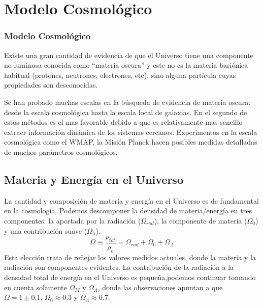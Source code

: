 \documentclass{beamer}
\begin{document}
\section{Modelo Cosmológico}
	\begin{frame}
		\frametitle{Modelo Cosmológico}
		Existe una gran cantidad de evidencia de que el Universo tiene una componente no luminosa conocida como ``materia oscura'' y este no es la materia bariónica habitual (protones, neutrones, electrones, etc), sino alguna partícula cuyas propiedades son desconocidas.

Se han probado muchas escalas en la búsqueda de evidencia de materia oscura: desde la escala cosmológica hasta la escala local de galaxias. En el segundo de estos métodos es el mas favorable debido a que es relativamente mas sencillo extraer información dinámica de los sistemas cercanos. Experimentos en la escala cosmológica como el WMAP, la Misión Planck hacen posibles medidas detalladas de muchos parámetros cosmológicos.

	\end{frame}

\subsection{Materia y Energía en el Universo}
	\begin{frame}
		La cantidad y composición de materia y energía en el Universo es de fundamental en la cosmología. Podemos descomponer la densidad de materia/energía en tres componentes: la aportada por la radiación ($\Omega_{rad}$), la componente de materia ($\Omega_{0}$) y una contribución suave ($\Omega_{\lambda}$).		
		\begin{equation}
			\Omega \equiv \frac{\rho_{tot}}{\rho_o} = \Omega_{rad} + \Omega_0 + \Omega_{\Lambda}
		\end{equation}
Esta elección trata de reflejar los valores medidos actuales, donde la materia y la radiación son componentes evidentes. La contribución de la radiación a la densidad total de energía en el Universo es pequeña,podemos continuar tomando en cuenta solamente $\Omega_{M}$ y $\Omega_{\Lambda}$, donde las observaciones apuntan a que $\Omega=1\pm 0.1$, $\Omega_{0}\approx 0.3$ y $\Omega_{\Lambda}\approx 0.7$.
	\end{frame}
	
\end{document}
